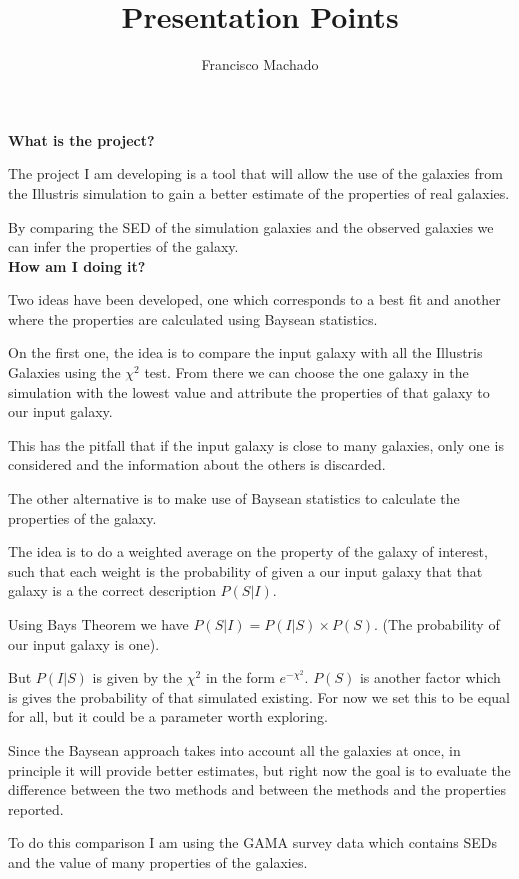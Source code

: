 \documentclass[11pt]{report}
\author{Francisco Machado}
\title{Presentation Points}
\begin{document}
\maketitle

{\bf What is the project?}

The project I am developing is a tool that will allow the use of the galaxies from the Illustris simulation to gain a better estimate of the properties of real galaxies.

By comparing the SED of the simulation galaxies and the observed galaxies we can infer the properties of the galaxy.\\

{\bf How am I doing it?}

Two ideas have been developed, one which corresponds to a best fit and another where the properties are calculated using Baysean statistics.

On the first one, the idea is to compare the input galaxy with all the Illustris Galaxies using the $\chi^2$ test. From there we can choose the one galaxy in the simulation with the lowest value and attribute the properties of that galaxy to our input galaxy.

This has the pitfall that if the input galaxy is close to many galaxies, only one is considered and the information about the others is discarded.

The other alternative is to make use of Baysean statistics to calculate the properties of the galaxy.

The idea is to do a weighted average on the property of the galaxy of interest, such that each weight is the probability of given a our input galaxy that that galaxy is a the correct description $P(S|I)$.

Using Bays Theorem we have $P(S|I) = P(I|S) \times P(S)$. (The probability of our input galaxy is one).

But $P(I|S)$ is given by the $\chi^2$  in the form $e^{-\chi^2}$. $P(S)$ is another factor which is gives the probability of that simulated existing. For now we set this to be equal for all, but it could be a parameter worth exploring.

Since the Baysean approach takes into account all the galaxies at once, in principle it will provide better estimates, but right now the goal is to evaluate the difference between the two methods and between the methods and the properties reported.

To do this comparison I am using the GAMA survey data which contains SEDs and the value of many properties of the galaxies.\\
\end{document}
